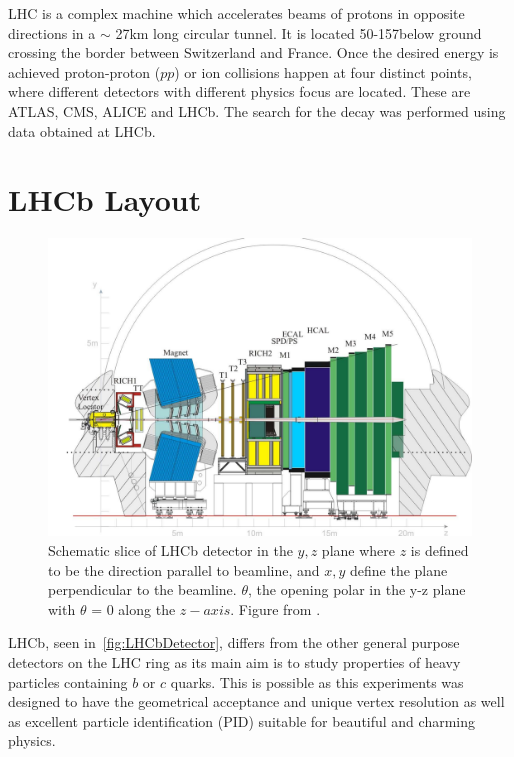 \Gls{LHC} is a complex machine which accelerates beams of protons in opposite directions in a $\sim$ 27km long circular tunnel. It is located
50-157\m below ground crossing the border between Switzerland and France. Once the desired energy is achieved proton-proton ($pp$) or ion collisions happen at four distinct points, where different detectors with different physics focus are located. These are \Gls{ATLAS}, \Gls{CMS}, \Gls{ALICE} and \Gls{LHCb}. 
The search for the decay \Bmumumu was performed using data obtained at \Gls{LHCb}. 

\section{LHCb Layout }

\begin{figure}
	\centering
	\includegraphics[scale = 0.25]{figs/detector/lhcbdet.pdf}
	\caption{Schematic slice of \Gls{LHCb} detector in the $y,z$ plane where $z$ is defined to be the direction parallel to beamline, and $x,y$ define the plane perpendicular to the beamline. $\theta$, the opening polar in the y-z plane with $\theta$ = 0 along the $z-axis$. Figure from \cite{LHCbdetector}.}
	\label{fig:LHCbDetector}
\end{figure}


\Gls{LHCb}, seen in~\autoref{fig:LHCbDetector}, differs from the other general purpose detectors on the \Gls{LHC} ring as its main aim is to study properties of heavy particles containing $b$ or $c$ quarks. This is possible as this experiments was designed to have the geometrical acceptance and unique vertex resolution as well as excellent particle identification (\Gls{PID}) suitable for beautiful and charming physics.

